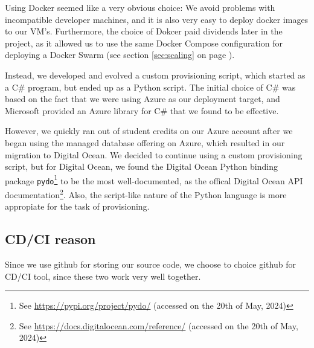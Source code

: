 Using Docker seemed like a very obvious choice: We avoid problems with incompatible developer machines, and it is also very easy to deploy docker images to our VM's. Furthermore, the choice of Dokcer paid dividends later in the project, as it allowed us to use the same Docker Compose configuration for deploying a Docker Swarm (see section \ref{sec:scaling} on page \pageref{sec:scaling}).

Instead, we developed and evolved a custom provisioning script, which started as a C\# program, but ended up as a Python script.
The initial choice of C\# was based on the fact that we were using Azure as our deployment target, and Microsoft provided an Azure library for C\# that we found to be effective.

However, we quickly ran out of student credits on our Azure account after we began using the managed database offering on Azure, which resulted in our migration to Digital Ocean.
We decided to continue using a custom provisioning script, but for Digital Ocean, we found the Digital Ocean Python binding package \texttt{pydo}\footnote{See \url{https://pypi.org/project/pydo/} (accessed on the 20th of May, 2024)} to be the most well-documented, as the offical Digital Ocean API documentation\footnote{See \url{https://docs.digitalocean.com/reference/} (accessed on the 20th of May, 2024)}.
Also, the script-like nature of the Python language is more appropiate for the task of provisioning.


\subsection{CD/CI reason}
Since we use github for storing our source code, we choose to choice github for CD/CI tool, since these two work very well together.





